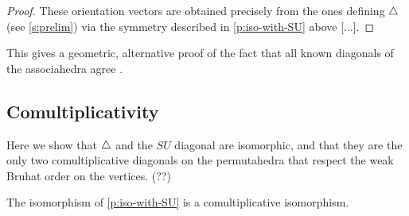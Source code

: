 \begin{proof}
    These orientation vectors are obtained precisely from the ones defining $\triangle$ (see \cref{s:prelim}) via the symmetry described in \cref{p:iso-with-SU} above [...]. 
\end{proof}

This gives a geometric, alternative proof of the fact that all known diagonals of the associahedra agree \cite{saneblidzeComparingDiagonalsAssociahedra2022}.





\subsection{Comultiplicativity}


Here we show that $\triangle$ and the $SU$ diagonal are isomorphic, and that they are the only two comultiplicative diagonals on the permutahedra that respect the weak Bruhat order on the vertices. (??)

The isomorphism of \cref{p:iso-with-SU} is a comultiplicative isomorphism.